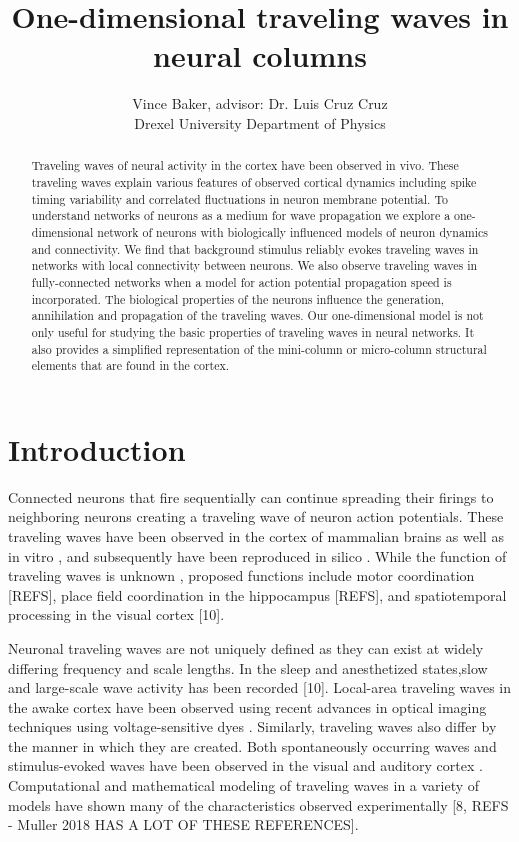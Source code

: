 \documentclass[a4paper,11pt]{article}
\title{One-dimensional traveling waves in neural columns}
\author{Vince Baker, advisor: Dr. Luis Cruz Cruz\\ Drexel University Department of Physics}
\begin{document}
\maketitle

\begin{abstract}
Traveling waves of neural activity in the cortex have been observed in vivo.
These traveling waves explain various features of observed cortical dynamics including spike timing variability and correlated fluctuations in neuron membrane potential.
To understand networks of neurons as a medium for wave propagation we explore a one-dimensional network of neurons with biologically influenced models of neuron dynamics and connectivity.
We find that background stimulus reliably evokes traveling waves in networks with local connectivity between neurons.
We also observe traveling waves in fully-connected networks when a model for action potential propagation speed is incorporated.
The biological properties of the neurons influence the generation, annihilation and propagation of the traveling waves. 
Our one-dimensional model is not only useful for studying the basic properties of traveling waves in neural networks.
It also provides a simplified representation of the mini-column or micro-column structural elements that are found in the cortex.

\end{abstract}

\section{Introduction} 
Connected neurons that fire sequentially can continue spreading their firings to neighboring neurons creating a traveling wave of neuron action potentials. 
These traveling waves have been observed in the cortex of mammalian brains \cite{muller2018}\cite{reimer2010}  as well as in vitro \cite{wu2008}\cite{huang2004}, and subsequently have been reproduced in silico \cite{keane2015}\cite{senk2020}. 
While the function of traveling waves is unknown \cite{wu2008}\cite{muller2018}, proposed functions include motor coordination [REFS], place field coordination in the hippocampus [REFS], and spatiotemporal processing in the visual cortex [10]. 

Neuronal traveling waves are not uniquely defined as they can exist at widely differing frequency and scale lengths.  
In the sleep and anesthetized states,slow and large-scale wave activity has been recorded [10]. 
Local-area traveling waves in the awake cortex have been observed using recent advances in optical imaging techniques using voltage-sensitive dyes \cite{wu2008}\cite{shoham1999}.  
Similarly, traveling waves also differ by the manner in which they are created. 
Both spontaneously occurring waves and stimulus-evoked \cite{reimer2010} waves have been observed in the visual and auditory cortex . 
Computational and mathematical modeling of traveling waves in a variety of models have shown many of the characteristics observed experimentally \cite{ermentrout2001}[8, REFS - Muller 2018 HAS A LOT OF THESE REFERENCES].
\end{document}
